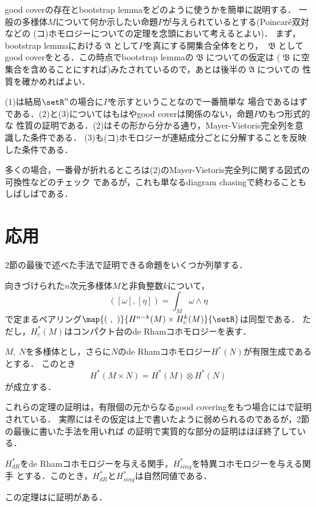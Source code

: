 \documentclass[uplatex]{jsarticle}
\begin{document}
good coverの存在とbootstrap lemmaをどのように使うかを簡単に説明する．
一般の多様体$M$について何か示したい命題$P$が与えられているとする(Poincar\'{e}双対などの
(コ)ホモロジーについての定理を念頭において考えるとよい)．
まず，bootstrap lemmaにおける$\mfrakA$として$P$を真にする開集合全体をとり，
$\mfrakB$としてgood coverをとる．この時点でbootstrap lemmaの$\mfrakB$についての仮定は
($\mfrakB$に空集合を含めることにすれば)みたされているので，あとは後半の$\mfrakA$についての
性質を確かめればよい．

(1)は結局$\setR^n$の場合に$P$を示すということなので一番簡単な
場合であるはずである．(2)と(3)についてはもはやgood coverは関係のない，命題$P$のもつ形式的な
性質の証明である．(2)はその形から分かる通り，Mayer-Vietoris完全列を意識した条件である．
(3)も(コ)ホモロジーが連結成分ごとに分解することを反映した条件である．

多くの場合，一番骨が折れるところは(2)のMayer-Vietoris完全列に関する図式の可換性などのチェック
であるが，これも単なるdiagram chasingで終わることもしばしばである．

\section{応用}
2節の最後で述べた手法で証明できる命題をいくつか列挙する．

\begin{theorem}[de RhamコホモロジーのPoincar\'{e}双対]
  向きづけられた$n$次元多様体$M$と非負整数$k$について，
    \[([\omega],[\eta])=\int_M \omega\wedge \eta\]
  で定まるペアリング$\map{(\ ,\ )}{H^{n-k}(M)\times H^k_c(M)}{\setR}$は同型である．
  ただし，$H^\ast_c(M)$はコンパクト台のde Rhamコホモロジーを表す．
\end{theorem}

\begin{theorem}
  $M,\ N$を多様体とし，さらに$N$のde Rhamコホモロジー$H^\ast(N)$が有限生成であるとする．
  このとき
    \[H^\ast(M\times N)=H^\ast(M)\otimes H^\ast(N)\]
  が成立する．
\end{theorem}

これらの定理の証明は，有限個の元からなるgood coveringをもつ場合には\cite{Bott--Tu}で証明されている．
実際にはその仮定は上で書いたように弱められるのであるが，2節の最後に書いた手法を用いれば
\cite{Bott--Tu}の証明で実質的な部分の証明はほぼ終了している．

\begin{theorem}
  $H_{dR}^\ast$をde Rhamコホモロジーを与える関手，$H_{sing}^\ast$を特異コホモロジーを与える関手
  とする．このとき，$H_{dR}^\ast$と$H_{sing}^\ast$は自然同値である．
\end{theorem}

この定理は\cite{LeeSmooth}に証明がある．




\end{document}
